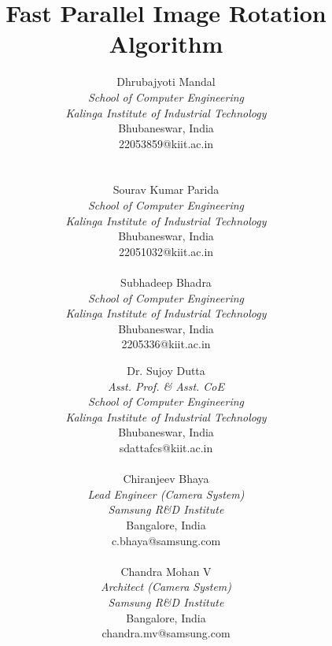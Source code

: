 \documentclass[conference]{IEEEtran}
\begin{document}
\title{Fast Parallel Image Rotation Algorithm}
\author {
    Dhrubajyoti Mandal \\
    \textit{School of Computer Engineering} \\
    \textit{Kalinga Institute of Industrial Technology} \\
    Bhubaneswar, India \\
    22053859@kiit.ac.in \\ \\ \\
    Sourav Kumar Parida \\
    \textit{School of Computer Engineering} \\
    \textit{Kalinga Institute of Industrial Technology} \\
    Bhubaneswar, India \\
    22051032@kiit.ac.in \\ \\
    Subhadeep Bhadra \\
    \textit{School of Computer Engineering} \\
    \textit{Kalinga Institute of Industrial Technology} \\
    Bhubaneswar, India \\
    2205336@kiit.ac.in
    \and
    Dr. Sujoy Dutta \\
    \textit{Asst. Prof. \& Asst. CoE} \\
    \textit{School of Computer Engineering} \\
    \textit{Kalinga Institute of Industrial Technology} \\
    Bhubaneswar, India \\
    sdattafcs@kiit.ac.in \\ \\
    Chiranjeev Bhaya \\
    \textit{Lead Engineer (Camera System)} \\
    \textit{Samsung R\&D Institute} \\
    Bangalore, India \\
    c.bhaya@samsung.com \\ \\
    Chandra Mohan V \\
    \textit{Architect (Camera System)} \\
    \textit{Samsung R\&D Institute} \\
    Bangalore, India \\
    chandra.mv@samsung.com
}
\maketitle
\end{document}
